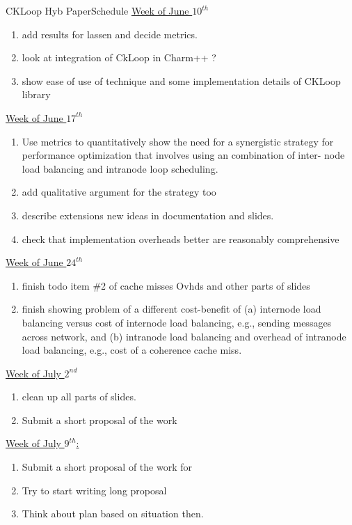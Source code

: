 \begin{frame}{CKLoop Hyb Paper}{Schedule}
\underline{Week of June $10^{th}$}\\ 
\begin{enumerate}
\tiny \item \tiny add results for lassen and decide metrics. 
\item \tiny look at integration of CkLoop in Charm++ ? 
\item \tiny show ease of use of technique and some implementation details of CKLoop library
\end{enumerate}

\underline{Week of June $17^{th}$} \\
\begin{enumerate}
\tiny \item \tiny Use metrics to quantitatively show the need for a synergistic strategy for performance optimization that involves using an combination of inter- node load balancing and intranode loop scheduling.
\item \tiny add qualitative argument for the strategy too 
\item \tiny describe extensions  new ideas in documentation and slides. 
\item \tiny  check that implementation overheads better are reasonably comprehensive 
\end{enumerate}

\underline{Week of June $24^{th}$}\\
\begin{enumerate}
\tiny \item \tiny finish todo item \#2 of cache misses Ovhds and other parts of slides
\item \tiny finish showing problem of a different cost-benefit of (a) internode load balancing versus cost of internode load balancing, e.g., sending messages across network, and (b) intranode load balancing and overhead of intranode load balancing, e.g., cost of a coherence cache miss.
\end{enumerate}

\underline{Week of July $2^{nd}$}\\

\begin{enumerate}
\tiny \item \tiny clean up all parts of slides.
\item \tiny Submit a short proposal of the work  
\end{enumerate}

\underline{Week of July $9^{th}$: } \\
\begin{enumerate}
\item \tiny Submit a short proposal of the work for 
\item \tiny Try to start writing long proposal
\item \tiny Think about plan based on situation then. 
\end{enumerate}

\end{frame}
